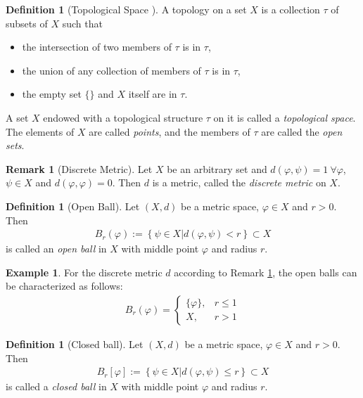 \documentclass[12pt, a4paper]{article}
\numberwithin{equation}{section}
\theoremstyle{definition}
\theoremstyle{definition}
\newtheorem{defn}[thm]{Definition} %
\newtheorem{exmp}[thm]{Example} %
\newtheorem{remark}[thm]{Remark} %
\begin{document}
	\begin{defn}[Topological Space \cite{topology-singh}]
		A topology on a set $X$ is a collection $\tau$ of subsets of $X$ such that 
		\begin{itemize}
			\item the intersection of two members of $\tau$ is in $\tau$, 
			\item the union of any collection of members of $\tau$ is in $\tau$, 
			\item the empty set $\{\}$ and $X$ itself are in $\tau$.
		\end{itemize}
		A set $X$ endowed with a topological structure $\tau$ on it is called a \textit{topological space}. The elements of $X$ are called \textit{points}, and the members of $\tau$ are called the \textit{open sets}. 
	\end{defn} 
	
	\begin{remark}[Discrete Metric]\label{remark:discrete-metric}
		Let $X$ be an arbitrary set and $d(\varphi, \psi) = 1 \ \forall \varphi$, $\psi\in X$ and $d(\varphi, \varphi) = 0$. Then $d$ is a metric, called the \textit{discrete metric} on $X$. 
	\end{remark}
	
	\begin{defn}[Open Ball]
		Let $(X, d)$ be a metric space, $\varphi\in X$ and $r > 0$. Then 
		\begin{align}
			B_{r}(\varphi) := \left\{ \psi\in X \vert d(\varphi, \psi) < r\right\} \subset X
		\end{align}
		is called an \textit{open ball} in $X$ with middle point $\varphi$ and radius $r$. 
 	\end{defn}
 
 	\begin{exmp}\label{exmp:open-balls-discrete-metric}
 		For the discrete metric $d$ according to Remark \ref{remark:discrete-metric}, the open balls can be characterized as follows:
 		\begin{align}
 			B_{r}(\varphi) = \begin{cases}
 				\{\varphi\}, &r \leq 1 
 				\\ X, &r > 1
 			\end{cases}
 		\end{align}
 	\end{exmp} 
	
	 \begin{defn}[Closed ball]
		Let $(X, d)$ be a metric space, $\varphi\in X$ and $r > 0$. Then 
		\begin{align}
			B_{r}[\varphi] := \left\{ \psi\in X \vert d(\varphi, \psi) \leq r\right\} \subset X
		\end{align}
		is called a \textit{closed ball} in $X$ with middle point $\varphi$ and radius $r$. 
	\end{defn}
	
\end{document}
